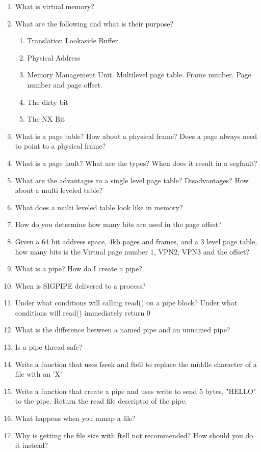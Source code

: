\begin{enumerate}
\item What is virtual memory?
\item What are the following and what is their purpose?
  \begin{enumerate}
    \item Translation Lookaside Buffer
    \item Physical Address
    \item Memory Management Unit. Multilevel page table. Frame number. Page number and page offset.
    \item The dirty bit
    \item The NX Bit
  \end{enumerate}
\item What is a page table? How about a physical frame? Does a page always need to point to a physical frame?
\item What is a page fault? What are the types? When does it result in a segfault?
\item What are the advantages to a single level page table? Disadvantages? How about a multi leveled table?
\item What does a multi leveled table look like in memory?
\item How do you determine how many bits are used in the page offset?
\item Given a 64 bit address space, 4kb pages and frames, and a 3 level page table, how many bits is the Virtual page number 1, VPN2, VPN3 and the offset?
\item What is a pipe? How do I create a pipe?
\item When is SIGPIPE delivered to a process?
\item Under what conditions will calling read() on a pipe block? Under what conditions will read() immediately return 0
\item What is the difference between a named pipe and an unnamed pipe?
\item Is a pipe thread safe?
\item Write a function that uses fseek and ftell to replace the middle character of a file with an 'X'
\item Write a function that create a pipe and uses write to send 5 bytes, "HELLO" to the pipe. Return the read file descriptor of the pipe.
\item What happens when you mmap a file?
\item Why is getting the file size with ftell not recommended? How should you do it instead?
\end{enumerate}



